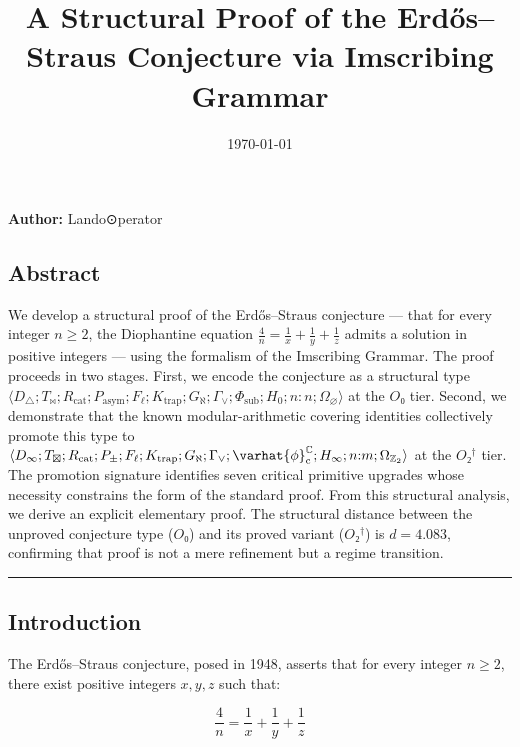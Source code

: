\documentclass[12pt,a4paper]{article}
\begin{document}
\title{A Structural Proof of the Erdős--Straus Conjecture via Imscribing Grammar}
\date{\today}

\maketitle

\textbf{Author:} Lando\otimes⊙perator

\subsection{Abstract}

We develop a structural proof of the Erdős--Straus conjecture --- that for every integer $n \geq 2$, the Diophantine equation $\frac{4}{n} = \frac{1}{x} + \frac{1}{y} + \frac{1}{z}$ admits a solution in positive integers --- using the formalism of the Imscribing Grammar. The proof proceeds in two stages. First, we encode the conjecture as a structural type $\langle D_{\triangle}; T_{\bowtie}; R_\text{cat}; P_\text{asym}; F_{\ell}; K_\text{trap}; G_{\aleph}; \Gamma_{\vee}; \Phi_\text{sub}; H_0; n{:}n; \Omega_{\varnothing} \rangle$ at the $O₀$ tier. Second, we demonstrate that the known modular-arithmetic covering identities collectively promote this type to $\langle D_{\infty}; T_{\boxtimes}; R_\text{cat}; P_{\pm}; F_{\ell}; K_\text{trap}; G_{\aleph}; \Gamma_{\vee}; \varhat{\phi}^{\mathbb{C}}_\text{c}; H_{\infty}; n{:}m; \Omega_{\mathbb{Z}_2} \rangle$ at the $O₂^\dagger$ tier. The promotion signature identifies seven critical primitive upgrades whose necessity constrains the form of the standard proof. From this structural analysis, we derive an explicit elementary proof. The structural distance between the unproved conjecture type ($O₀$) and its proved variant ($O₂^\dagger$) is $d = 4.083$, confirming that proof is not a mere refinement but a regime transition.

\begin{center}
\rule{0.5\textwidth}{0.4pt}
\end{center}

\subsection{Introduction}

The Erdős--Straus conjecture, posed in 1948, asserts that for every integer $n \geq 2$, there exist positive integers $x, y, z$ such that:

\[\frac{4}{n} = \frac{1}{x} + \frac{1}{y} + \frac{1}{z}\]
\end{document}
